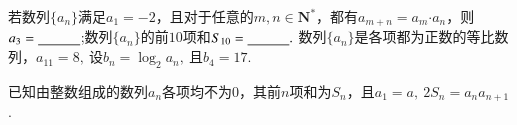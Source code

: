 \documentclass{BHCexam}
\begin{document}
\begin{questions}
\qs 若数列$\{a_n\}$满足$a_1=-2$，且对于任意的$ m,n \in\mathbf{N^*}$，都有$ a_{m+n}=a_m\bm{\cdot}a_n $，则$ a_3=\underline{\hspace{3em}} $;数列$\{a_n\}$的前$ 10 $项和$ S_{10}=\underline{\hspace{3em}}. $
\qs 数列$\{a_n\}$是各项都为正数的等比数列，$ a_{11}=8 ,~$设$ b_n=\log_2a_n,~ $且$ b_4 =17.$
\qs 已知由整数组成的数列$ {a_n} $各项均不为$ 0 $，其前$ n $项和为$S_n$，且$a_1=a,\ 2S_n=a_na_{n+1}$.





\end{questions}
\end{document}
